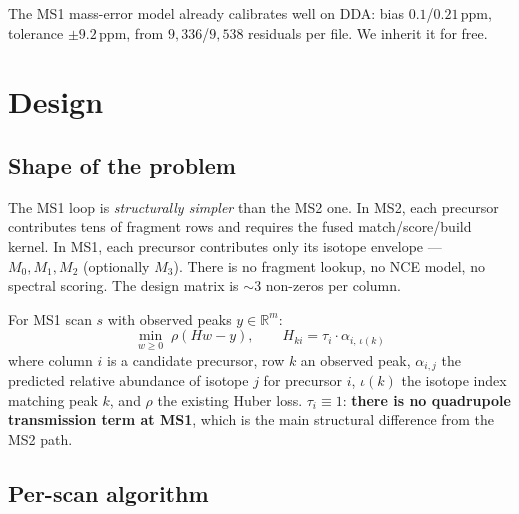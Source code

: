\documentclass[11pt]{article}
\begin{document}
\noindent The MS1 mass-error model already calibrates well on DDA: bias $0.1$/$0.21$\,ppm,
tolerance $\pm9.2$\,ppm, from $9{,}336$/$9{,}538$ residuals per file. We inherit it for free.

\section{Design}

\subsection{Shape of the problem}

The MS1 loop is \emph{structurally simpler} than the MS2 one. In MS2, each precursor
contributes tens of fragment rows and requires the fused match/score/build kernel. In MS1,
each precursor contributes only its isotope envelope --- $M_0,M_1,M_2$ (optionally $M_3$).
There is no fragment lookup, no NCE model, no spectral scoring. The design matrix is
$\sim$3 non-zeros per column.

For MS1 scan $s$ with observed peaks $y \in \mathbb{R}^{m}$:
\[
\min_{w \ge 0} \; \rho\!\left( H w - y \right), \qquad
H_{ki} = \tau_i \cdot \alpha_{i,\,\iota(k)}
\]
where column $i$ is a candidate precursor, row $k$ an observed peak, $\alpha_{i,j}$ the
predicted relative abundance of isotope $j$ for precursor $i$, $\iota(k)$ the isotope index
matching peak $k$, and $\rho$ the existing Huber loss. $\tau_i \equiv 1$: \textbf{there is no
quadrupole transmission term at MS1}, which is the main structural difference from the MS2 path.

\subsection{Per-scan algorithm}
\end{document}
